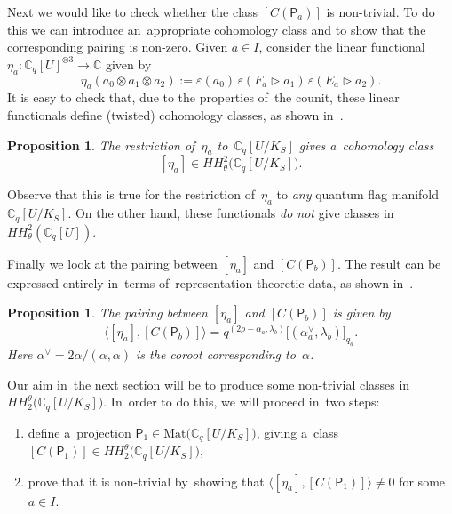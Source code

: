 \documentclass[pdftex]{sigma}
\numberwithin{equation}{section}
\newtheorem{Proposition}[Theorem]{Proposition}
 { \theoremstyle{definition}
\newtheorem{Definition}[Theorem]{Definition}
\newtheorem{Note}[Theorem]{Note}
\newtheorem{Example}[Theorem]{Example}
\newtheorem{Remark}[Theorem]{Remark} }
\newcommand{\CqU}{\mathbb{C}_q[U]}
\newcommand{\Cqflag}{\mathbb{C}_q[U / K_S]}
\newcommand{\bbC}{\mathbb{C}}
\newcommand{\proj}{\mathsf{P}}
\begin{document}
Next we would like to check whether the class $[C(\proj_a)]$ is non-trivial.
To do this we can int\-ro\-duce an~appropriate cohomology class and to show that the corresponding pairing is non-zero.
Given $a \in I$, consider the linear functional $\eta_a\colon \CqU^{\otimes 3} \to \bbC$ given by
\[
\eta_a(a_0 \otimes a_1 \otimes a_2) := \varepsilon(a_0)\, \varepsilon(F_a \triangleright a_1) \, \varepsilon(E_a \triangleright a_2).
\]
It is easy to check that, due to the properties of~the counit, these linear functionals define (twisted) cohomology classes, as shown in~\cite[Proposition~5.5]{twist-hoch}.

\begin{Proposition}
The restriction of~$\eta_a$ to~$\Cqflag$ gives a~cohomology class
\[
[\eta_a] \in HH^2_\theta\big(\Cqflag\big).
\]
\end{Proposition}

\begin{Remark}
Observe that this is true for the restriction of~$\eta_a$ to \emph{any} quantum flag manifold $\Cqflag$.
On the other hand, these functionals \emph{do not} give classes in~$HH^2_\theta(\CqU)$.
\end{Remark}

Finally we look at the pairing between $[\eta_a]$ and $[C(\proj_b)]$.
The result can be expressed entirely in~terms of~representation-theoretic data, as shown in~\cite[Proposition~6.11]{twist-hoch}.

\begin{Proposition}
\label{prop:pairing-classes}
The pairing between $[\eta_a]$ and $[C(\proj_b)]$ is given by
\[
\big\langle [\eta_a], [C(\proj_b)] \big\rangle = q^{(2 \rho - \alpha_a, \lambda_b)}
\big[(\alpha_a^\vee, \lambda_b)\big]_{q_a}.
\]
Here $\alpha^\vee = 2 \alpha / (\alpha, \alpha)$ is the coroot corresponding to~$\alpha$.
\end{Proposition}

Our aim in~the next section will be to produce some non-trivial classes in~$HH^\theta_2\big(\Cqflag\big)$.
In~order to do this, we will proceed in~two steps:
\begin{enumerate}\itemsep=0pt
\item[1)] define a~projection $\proj_1 \in \mathrm{Mat}\big(\Cqflag\big)$, giving a~class $[C(\proj_1)] \in HH^\theta_2\big(\Cqflag\big)$,
\item[2)] prove that it is non-trivial by~showing that $\langle [\eta_a], [C(\proj_1)]\rangle \neq 0$ for some $a \in I$.
\end{enumerate}
\end{document}
